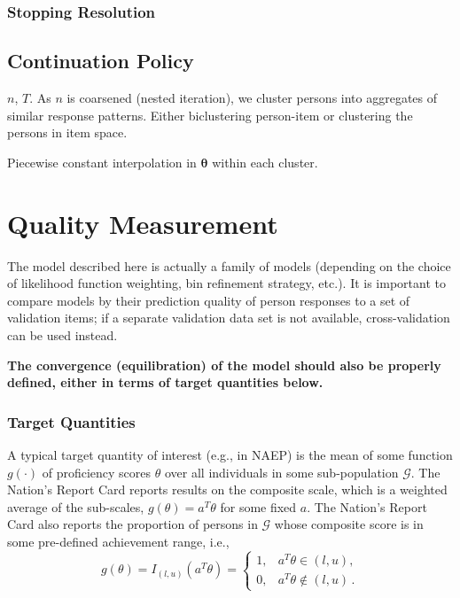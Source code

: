 \documentclass{article}
\newcommand{\bta}{\boldsymbol\ta}
\newcommand{\ta}{\theta}
\newcommand{\G}{\mathcal{G}}
\begin{document}
\subsubsection{Stopping Resolution}

\subsection{Continuation Policy}
$n$, $T$. As $n$ is coarsened (nested iteration), we cluster persons into aggregates of similar
response patterns. Either biclustering person-item or clustering the persons in item space.


Piecewise constant interpolation in $\bta$ within each cluster.

\section{Quality Measurement}
The model described here is actually a family of models (depending on the choice of likelihood function weighting, bin refinement strategy, etc.). It is important to compare models by their prediction quality of
person responses to a set of validation items; if a separate validation data set is not available, cross-validation can be used instead.

{\bf The convergence (equilibration) of the model should also be properly defined, either in terms of target quantities below.}

\subsubsection{Target Quantities}
A typical target quantity of interest (e.g., in NAEP) is the mean of some function $g(\cdot)$ of proficiency scores $\ta$ over all individuals in some sub-population $\G$. The Nation's Report Card reports results on the composite scale, which is a weighted average of the sub-scales, $g(\ta) = a^T \ta$ for some fixed $a$. The Nation's Report Card also reports the proportion of persons in $\G$ whose composite score is in some pre-defined achievement range, i.e.,
\begin{equation}
	g(\ta) = I_{(l,u)}(a^T \ta) =
  \begin{cases}
    1, & a^T \ta \in (l,u), \\
    0, & a^T \ta \not \in (l,u)\,.
  \end{cases}
\end{equation}
\end{document}
